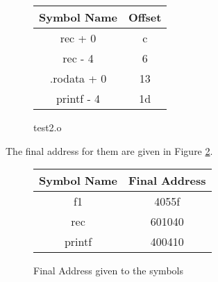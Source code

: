 \documentclass{article}
\begin{document}
\begin{figure}[h!]
\begin{center}
\begin{tabular}{|c|c|}
\hline
\textbf{Symbol Name} & \textbf{Offset} \\
\hline
rec + 0 & c \\
rec - 4 & 6 \\
.rodata + 0 & 13 \\
printf - 4 & 1d\\
\hline
\end{tabular}
\caption{test2.o}
\label{tab2}
\end{center}
\end{figure}

The final address for them are given in Figure \ref{fin}.
\begin{figure}[h!]
\begin{center}
\begin{tabular}{|c|c|}
\hline
\textbf{Symbol Name} & \textbf{Final Address} \\
\hline
f1   & 4055f \\
rec  & 601040 \\
printf  & 400410\\
\hline
\end{tabular}
\caption{Final Address given to the symbols}
\label{fin}
\end{center}
\end{figure}
\end{document}
